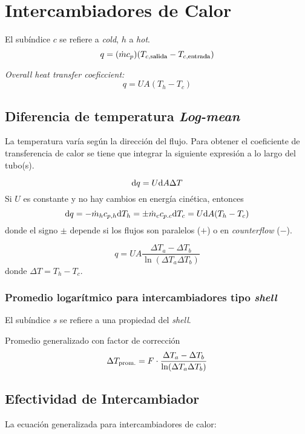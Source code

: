 \section{Intercambiadores de Calor}
El subíndice $c$ se refiere a \emph{cold}, $h$ a \emph{hot}. 
\begin{equation}
    q=(\dot{m}c_p)(T_{c,\salida}-T_{c,\entrada})
\end{equation}

\emph{Overall heat transfer coeficcient:}
\begin{equation}
    q=UA(T_h-T_c)
\end{equation}
\subsection{Diferencia de temperatura \textit{Log-mean}}
La temperatura varía según la dirección del flujo. Para obtener el coeficiente de transferencia de calor se tiene que integrar la siguiente expresión a lo largo del tubo(s).

\[ \textrm{d} q=U\textrm{d} A\Delta T
\]
Si $U$ es constante y no hay cambios en energía cinética, entonces 
\begin{equation}
    \textrm{d} q = - \dot{m}_h c_{p,h} \textrm{d} T_h = \pm \dot{m}_c c_{p.c} \textrm{d} T_c = U \textrm{d} A (T_h-T_c)
\end{equation}
donde el signo $\pm$ depende si los flujos son paralelos ($+$) o en \emph{counterflow} ($-$).


\begin{equation}
    q=UA\frac{\Delta T_a-\Delta T_b}{\ln (\Delta T_a\Delta T_b)}
\end{equation}
donde $\Delta T=T_h - T_c$.

\subsubsection*{Promedio logarítmico para intercambiadores tipo \textit{shell}}
El subíndice $s$ se refiere a una propiedad del \textit{shell}.

Promedio generalizado con factor de corrección
\begin{equation}
    \Delta T_{\textrm{prom.}}=F\cdot\frac{\Delta T_a-\Delta T_b}{\ln (\Delta T_a\Delta T_b)}
\end{equation}

\subsection{Efectividad de Intercambiador}
La ecuación generalizada para intercambiadores de calor:


